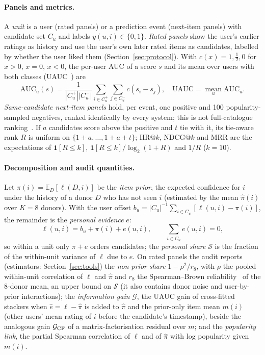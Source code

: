 \paragraph{Panels and metrics.}
A \emph{unit} is a user (rated panels) or a prediction event (next-item panels) with candidate set $C_u$ and labels
$y(u,i)\in\{0,1\}$. \emph{Rated panels} show the user's earlier ratings as history and use the user's own later rated items as
candidates, labelled by whether the user liked them (Section~\ref{sec:protocol}). With
$c(x)=1,\tfrac12,0$ for $x>0,\,x=0,\,x<0$, the per-user AUC of a score $s$ and its mean over users with both classes
(UAUC~\citep{zhang2025collm,zhang2024binllm}) are
\[
  \mathrm{AUC}_u(s)=\frac{1}{|C_u^+||C_u^-|}\sum_{i\in C_u^+}\sum_{j\in C_u^-}c(s_i-s_j),\quad
  \mathrm{UAUC}=\operatorname*{mean}_{u}\mathrm{AUC}_u .
\]
\emph{Same-candidate next-item panels} hold, per event, one positive and 100 popularity-sampled negatives, ranked identically
by every system; this is not full-catalogue ranking~\citep{krichene2020sampled}. If $a$ candidates score above the positive and
$t$ tie with it, its tie-aware rank $R$ is uniform on $\{1{+}a,\dots,1{+}a{+}t\}$; HR@$k$, NDCG@$k$ and MRR are the expectations
of $\mathbf 1[R{\le}k]$, $\mathbf 1[R{\le}k]/\log_2(1{+}R)$ and $1/R$ ($k{=}10$).

\paragraph{Decomposition and audit quantities.}
Let $\pi(i)=\mathbb E_D[\ell(D,i)]$ be the \emph{item prior}, the expected confidence for $i$ under the history of a donor
$D$ who has not seen $i$ (estimated by the mean $\hat\pi(i)$ over $K=8$ donors). With the user offset
$b_u=|C_u|^{-1}\sum_{i\in C_u}[\ell(u,i)-\pi(i)]$, the remainder is the \emph{personal evidence} $e$:
\begin{equation}\label{eq:decomp}
  \ell(u,i)=b_u+\pi(i)+e(u,i),\qquad \textstyle\sum_{i\in C_u}e(u,i)=0,
\end{equation}
so within a unit only $\pi+e$ orders candidates; the \emph{personal share} $\mathcal S$ is the fraction of the within-unit
variance of $\ell$ due to $e$. On rated panels the audit reports (estimators: Section~\ref{sec:tools}) the \emph{non-prior share}
$1-\rho^2/r_8$, with $\rho$ the pooled within-unit correlation of $\ell$ and $\hat\pi$ and $r_8$ the Spearman--Brown
reliability~\citep{spearman1910correlation,brown1910experimental} of the 8-donor mean, an upper bound on $\mathcal S$ (it also
contains donor noise and user-by-prior interactions); the \emph{information gain} $\mathcal G$, the UAUC gain of cross-fitted
stackers when $\hat e=\ell-\hat\pi$ is added to $\hat\pi$ and the prior-only item mean $m(i)$ (other users' mean rating of $i$
before the candidate's timestamp), beside the analogous gain $\mathcal G_{\rm CF}$ of a matrix-factorisation residual over $m$;
and the \emph{popularity link}, the partial Spearman correlation of $\ell$ and of $\hat\pi$ with log popularity given $m(i)$.

